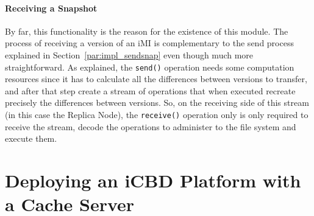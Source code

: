 \paragraph{Receiving a Snapshot}
\label{par:impl_receive_snap}
By far, this functionality is the reason for the existence of this module. The process of receiving a version of an iMI is complementary to the send process explained in Section~\ref{par:impl_sendsnap} even though much more straightforward. 
As explained, the \texttt{send()} operation needs some computation resources since it has to calculate all the differences between versions to transfer, and after that step create a stream of operations that when executed recreate precisely the differences between versions. 
So, on the receiving side of this stream (in this case the Replica Node), the \texttt{receive()} operation only is only required to receive the stream, decode the operations to administer to the file system and execute them.






\section{Deploying an iCBD Platform with a Cache Server}
\label{sec:impl_cache_server}


